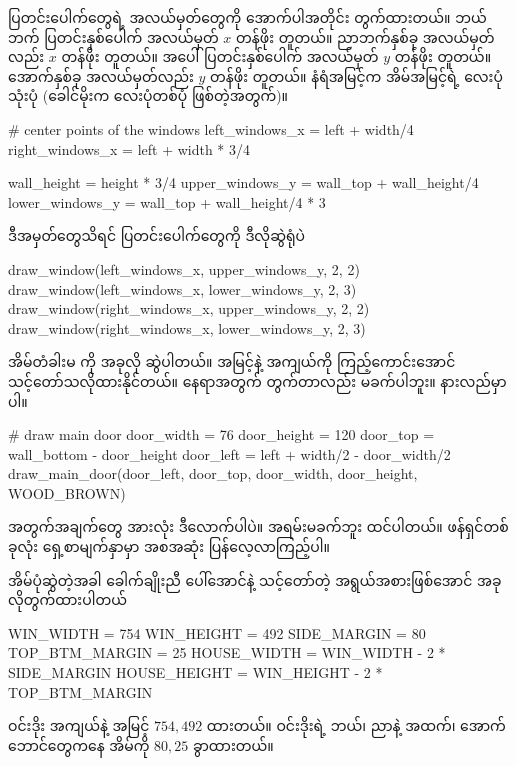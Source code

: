 ပြတင်းပေါက်တွေရဲ့ အလယ်မှတ်တွေကို အောက်ပါအတိုင်း တွက်ထားတယ်။ ဘယ်ဘက် ပြတင်းနှစ်ပေါက် အလယ်မှတ် $x$ တန်ဖိုး တူတယ်။ ညာဘက်နှစ်ခု အလယ်မှတ်လည်း $x$ တန်ဖိုး တူတယ်။ အပေါ် ပြတင်းနှစ်ပေါက် အလယ်မှတ် $y$ တန်ဖိုး တူတယ်။ အောက်နှစ်ခု အလယ်မှတ်လည်း $y$ တန်ဖိုး တူတယ်။ နံရံအမြင့်က အိမ်အမြင့်ရဲ့ လေးပုံသုံးပုံ (ခေါင်မိုးက လေးပုံတစ်ပုံ ဖြစ်တဲ့အတွက်)။
%
\begin{py}
# center points of the windows
left_windows_x = left + width/4
right_windows_x = left + width * 3/4

wall_height = height * 3/4
upper_windows_y = wall_top + wall_height/4
lower_windows_y = wall_top + wall_height/4 * 3
\end{py}
%
ဒီအမှတ်တွေသိရင် ပြတင်းပေါက်တွေကို ဒီလိုဆွဲရုံပဲ 
%
\begin{py}
draw_window(left_windows_x, upper_windows_y, 2, 2)
draw_window(left_windows_x, lower_windows_y, 2, 3)
draw_window(right_windows_x, upper_windows_y, 2, 2)
draw_window(right_windows_x, lower_windows_y, 2, 3)
\end{py}
%
အိမ်တံခါးမ ကို အခုလို ဆွဲပါတယ်။ အမြင့်နဲ့ အကျယ်ကို ကြည့်ကောင်းအောင် သင့်တော်သလိုထားနိုင်တယ်။ နေရာအတွက် \fEn{,}  တွက်တာလည်း မခက်ပါဘူး။ နားလည်မှာပါ။

%
\begin{py}
# draw main door
door_width = 76
door_height = 120
door_top = wall_bottom - door_height
door_left = left + width/2 - door_width/2
draw_main_door(door_left, door_top,
               door_width, door_height,
               WOOD_BROWN)
\end{py}
%
အတွက်အချက်တွေ အားလုံး ဒီလောက်ပါပဲ။ အရမ်းမခက်ဘူး ထင်ပါတယ်။  ဖန်ရှင်တစ်ခုလုံး ရှေ့စာမျက်နှာမှာ အစအဆုံး ပြန်လေ့လာကြည့်ပါ။

အိမ်ပုံဆွဲတဲ့အခါ ခေါက်ချိုးညီ ပေါ်အောင်နဲ့ သင့်တော်တဲ့ အရွယ်အစားဖြစ်အောင် အခုလိုတွက်ထားပါတယ်
%
\begin{py}
WIN_WIDTH = 754
WIN_HEIGHT = 492
SIDE_MARGIN = 80
TOP_BTM_MARGIN = 25
HOUSE_WIDTH = WIN_WIDTH - 2 * SIDE_MARGIN
HOUSE_HEIGHT = WIN_HEIGHT - 2 * TOP_BTM_MARGIN
\end{py}
% 
ဝင်းဒိုး အကျယ်နဲ့ အမြင့် $754, 492$  ထားတယ်။ ဝင်းဒိုးရဲ့ ဘယ်၊ ညာနဲ့ အထက်၊ အောက် ဘောင်တွေကနေ အိမ်ကို  $80, 25$  ခွာထားတယ်။

